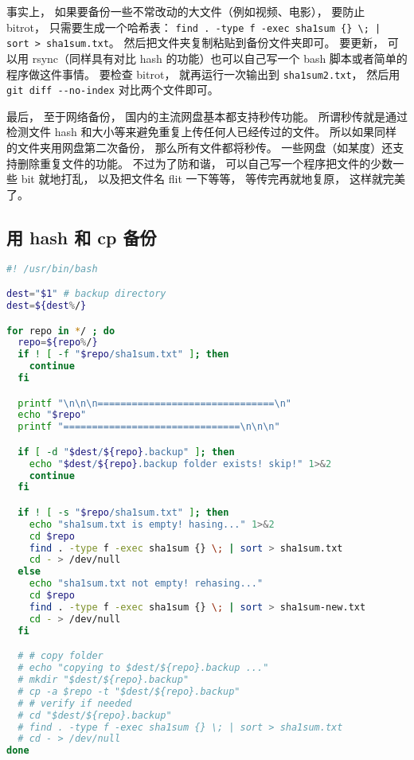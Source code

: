 
\begin{issues}
\issueDraft
\end{issues}

事实上， 如果要备份一些不常改动的大文件（例如视频、电影）， 要防止 bitrot， 只需要生成一个哈希表： \verb`find . -type f -exec sha1sum {} \; | sort > sha1sum.txt`。 然后把文件夹复制粘贴到备份文件夹即可。 要更新， 可以用 rsync（同样具有对比 hash 的功能）也可以自己写一个 bash 脚本或者简单的程序做这件事情。 要检查 bitrot， 就再运行一次输出到 \verb|sha1sum2.txt|， 然后用 \verb|git diff --no-index| 对比两个文件即可。

最后， 至于网络备份， 国内的主流网盘基本都支持秒传功能。 所谓秒传就是通过检测文件 hash 和大小等来避免重复上传任何人已经传过的文件。 所以如果同样的文件夹用网盘第二次备份， 那么所有文件都将秒传。 一些网盘（如某度）还支持删除重复文件的功能。 不过为了防和谐， 可以自己写一个程序把文件的少数一些 bit 就地打乱， 以及把文件名 flit 一下等等， 等传完再就地复原， 这样就完美了。


\subsection{用 hash 和 cp 备份}

\begin{lstlisting}[language=bash]
#! /usr/bin/bash

dest="$1" # backup directory
dest=${dest%/}

for repo in */ ; do
  repo=${repo%/}
  if ! [ -f "$repo/sha1sum.txt" ]; then
    continue
  fi

  printf "\n\n\n===============================\n"
  echo "$repo"
  printf "===============================\n\n\n"

  if [ -d "$dest/${repo}.backup" ]; then
    echo "$dest/${repo}.backup folder exists! skip!" 1>&2
    continue
  fi

  if ! [ -s "$repo/sha1sum.txt" ]; then
    echo "sha1sum.txt is empty! hasing..." 1>&2
    cd $repo
    find . -type f -exec sha1sum {} \; | sort > sha1sum.txt
    cd - > /dev/null
  else
    echo "sha1sum.txt not empty! rehasing..."
    cd $repo
    find . -type f -exec sha1sum {} \; | sort > sha1sum-new.txt
    cd - > /dev/null
  fi

  # # copy folder
  # echo "copying to $dest/${repo}.backup ..."
  # mkdir "$dest/${repo}.backup"
  # cp -a $repo -t "$dest/${repo}.backup"
  # # verify if needed
  # cd "$dest/${repo}.backup"
  # find . -type f -exec sha1sum {} \; | sort > sha1sum.txt
  # cd - > /dev/null
done
\end{lstlisting}
